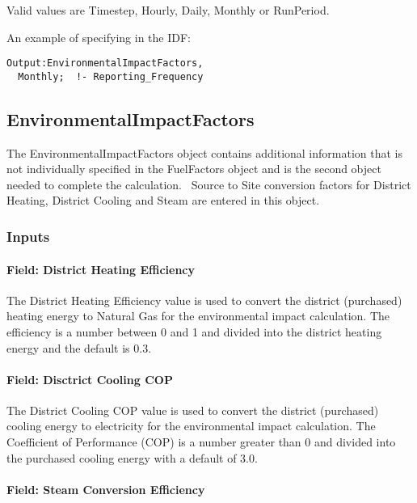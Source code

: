 Valid values are Timestep, Hourly, Daily, Monthly or RunPeriod.

An example of specifying in the IDF:

\begin{lstlisting}
Output:EnvironmentalImpactFactors,
  Monthly;  !- Reporting_Frequency
\end{lstlisting}

\subsection{EnvironmentalImpactFactors}\label{environmentalimpactfactors}

The EnvironmentalImpactFactors object contains additional information that is not individually specified in the FuelFactors object and is the second object needed to complete the calculation.~ Source to Site conversion factors for District Heating, District Cooling and Steam are entered in this object.

\subsubsection{Inputs}\label{inputs-10-016}

\paragraph{Field: District Heating Efficiency}\label{field-district-heating-efficiency}

The District Heating Efficiency value is used to convert the district (purchased) heating energy to Natural Gas for the environmental impact calculation. The efficiency is a number between 0 and 1 and divided into the district heating energy and the default is 0.3.

\paragraph{Field: Disctrict Cooling COP}\label{field-disctrict-cooling-cop}

The District Cooling COP value is used to convert the district (purchased) cooling energy to electricity for the environmental impact calculation. The Coefficient of Performance (COP) is a number greater than 0 and divided into the purchased cooling energy with a default of 3.0.

\paragraph{Field: Steam Conversion Efficiency}\label{field-steam-conversion-efficiency}

